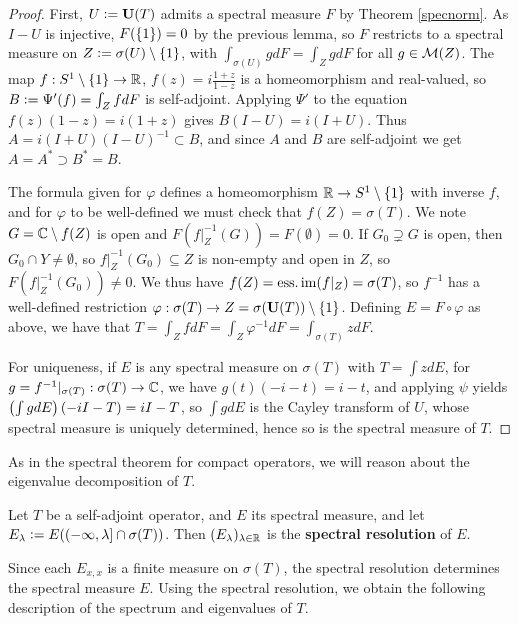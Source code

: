 \documentclass[10pt]{amsart}
\begin{document}
\begin{proof}
    First, $U \vcentcolon= \mathbf{U}(T)$ admits a spectral measure $F$ by Theorem \ref{specnorm}. As $I - U$ is injective, $F(\left\{  1  \right\}) = 0$ by the previous lemma, so $F$ restricts to a spectral measure on $Z \vcentcolon= \sigma(U) \setminus \left\{  1  \right\}$, with $\int_{\sigma(U)} g dF = \int_Z g dF$ for all $g \in \mathcal{M}(Z)$. The map $f : S^1 \setminus \left\{  1  \right\} \to \mathbb{R}$, $f(z) = i\frac{1 + z}{1 - z}$ is a homeomorphism and real-valued, so $B \vcentcolon= \Psi'(f) = \int_Z f dF$ is self-adjoint. Applying $\Psi'$ to the equation $f(z)(1 - z) = i(1 + z)$ gives $B(I - U) = i(I + U)$. Thus $A = i(I + U)(I - U)^{-1} \subset B$, and since $A$ and $B$ are self-adjoint we get $A = A^* \supset B^* = B$.

    The formula given for $\varphi$ defines a homeomorphism $\mathbb{R} \to S^1 \setminus \left\{  1  \right\}$ with inverse $f$, and for $\varphi$ to be well-defined we must check that $f(Z) = \sigma(T)$. We note $G = \mathbb{C} \setminus f(Z)$ is open and $F(f|_Z^{-1}(G)) = F(\emptyset) = 0$. If $G_0 \supsetneq G$ is open, then $G_0 \cap Y \neq \emptyset$, so $f|_Z^{-1}(G_0) \subseteq Z$ is non-empty and open in $Z$, so $F(f|_Z^{-1}(G_0)) \neq 0$. We thus have $f(Z) = \operatorname{ess.im}(f|_Z) = \sigma(T)$, so $f^{-1}$ has a well-defined restriction $\varphi : \sigma(T) \to Z = \sigma(\mathbf{U}(T)) \setminus \left\{  1  \right\}$. Defining $E = F \circ \varphi$ as above, we have that $T = \int_Z f dF = \int_Z \varphi^{-1} dF = \int_{\sigma(T)} z dF$.

    For uniqueness, if $E$ is any spectral measure on $\sigma(T)$ with $T = \int z dE$, for $g = f^{-1}|_{\sigma(T)} : \sigma(T) \to \mathbb{C}$, we have $g(t)(-i - t) = i - t$, and applying $\psi$ yields $\left(  \int g dE  \right)(-iI - T) = iI - T$, so $\int g dE$ is the Cayley transform of $U$, whose spectral measure is uniquely determined, hence so is the spectral measure of $T$.
\end{proof}
As in the spectral theorem for compact operators, we will reason about the eigenvalue decomposition of $T$. 
\begin{definition}
    Let $T$ be a self-adjoint operator, and $E$ its spectral measure, and let $E_\lambda \vcentcolon= E((-\infty, \lambda] \cap \sigma(T))$. Then $(E_\lambda)_{\lambda \in \mathbb{R}}$ is the \textbf{spectral resolution} of $E$.
\end{definition}
Since each $E_{x, x}$ is a finite measure on $\sigma(T)$, the spectral resolution determines the spectral measure $E$. Using the spectral resolution, we obtain the following description of the spectrum and eigenvalues of $T$.
\end{document}
